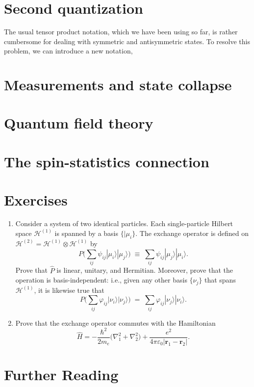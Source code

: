 \documentclass[pra,12pt]{revtex4}
\begin{document}
\section{Second quantization}

The usual tensor product notation, which we have been using so far, is
rather cumbersome for dealing with symmetric and antisymmetric states.
To resolve this problem, we can introduce a new notation,


\section{Measurements and state collapse}

\section{Quantum field theory}
\label{sec:qft}

\section{The spin-statistics connection}
\label{sec:spinstats}

\section*{Exercises}

\begin{enumerate}
\item Consider a system of two identical particles.  Each
  single-particle Hilbert space $\mathscr{H}^{(1)}$ is spanned by a
  basis $\{|\mu_i\}$.  The exchange operator is defined on
  $\mathscr{H}^{(2)} = \mathscr{H}^{(1)} \otimes \mathscr{H}^{(1)}$ by
$$P \Big (\sum_{ij} \psi_{ij} |\mu_i\rangle|\mu_j\rangle \Big)
  \;\equiv\;  \sum_{ij} \psi_{ij} |\mu_j\rangle|\mu_i\rangle.$$
  Prove that $\hat{P}$ is linear, unitary, and Hermitian.  Moreover,
  prove that the operation is basis-independent: i.e., given any other
  basis $\{\nu_j\}$ that spans $\mathscr{H}^{(1)}$, it is likewise
  true that
$$P \Big (\sum_{ij} \varphi_{ij} |\nu_i\rangle|\nu_j\rangle \Big)
  \;=\;  \sum_{ij} \varphi_{ij} |\nu_j\rangle|\nu_i\rangle.$$
  \label{ex:1}

\item
  Prove that the exchange operator commutes with the Hamiltonian
$$\hat{H} = - \frac{\hbar^2}{2m_e} \Big(\nabla_1^2 + \nabla^2_2\Big) + \frac{e^2}{4\pi\varepsilon_0|\mathbf{r}_1 - \mathbf{r}_2|}.$$ \label{ex:2}
  
\end{enumerate}

\section*{Further Reading}

\end{document}
